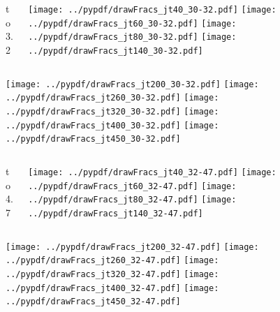 \documentclass[aspectratio=169]{beamer}
\begin{document}
\begin{figure}[p]
\flushleft
\begin{columns}[T]
\begin{column}{.2\linewidth}
 to 3.2
\end{column}
\begin{column}{.8\linewidth}
\texttt{[image: ../pypdf/drawFracs\_jt40\_30-32.pdf]}
\texttt{[image: ../pypdf/drawFracs\_jt60\_30-32.pdf]}
\texttt{[image: ../pypdf/drawFracs\_jt80\_30-32.pdf]}
\texttt{[image: ../pypdf/drawFracs\_jt140\_30-32.pdf]}
\end{column}
\end{columns}
\texttt{[image: ../pypdf/drawFracs\_jt200\_30-32.pdf]}
\texttt{[image: ../pypdf/drawFracs\_jt260\_30-32.pdf]}
\texttt{[image: ../pypdf/drawFracs\_jt320\_30-32.pdf]}
\texttt{[image: ../pypdf/drawFracs\_jt400\_30-32.pdf]}
\texttt{[image: ../pypdf/drawFracs\_jt450\_30-32.pdf]}
\end{figure}

\begin{figure}[p]
\flushleft
\begin{columns}[T]
\begin{column}{.2\linewidth}
 to 4.7
\end{column}
\begin{column}{.8\linewidth}
\texttt{[image: ../pypdf/drawFracs\_jt40\_32-47.pdf]}
\texttt{[image: ../pypdf/drawFracs\_jt60\_32-47.pdf]}
\texttt{[image: ../pypdf/drawFracs\_jt80\_32-47.pdf]}
\texttt{[image: ../pypdf/drawFracs\_jt140\_32-47.pdf]}
\end{column}
\end{columns}
\texttt{[image: ../pypdf/drawFracs\_jt200\_32-47.pdf]}
\texttt{[image: ../pypdf/drawFracs\_jt260\_32-47.pdf]}
\texttt{[image: ../pypdf/drawFracs\_jt320\_32-47.pdf]}
\texttt{[image: ../pypdf/drawFracs\_jt400\_32-47.pdf]}
\texttt{[image: ../pypdf/drawFracs\_jt450\_32-47.pdf]}
\end{figure}
\end{document}
